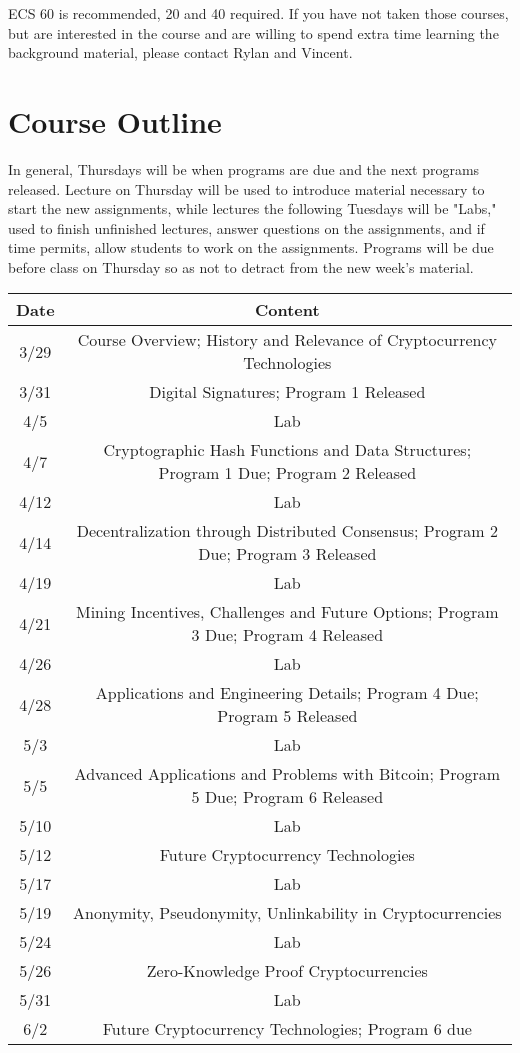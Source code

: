\documentclass{article}
\begin{document}
ECS 60 is recommended, 20 and 40 required. If you have not taken those courses, but are interested in the course and are willing to spend extra time learning the background material, please contact Rylan and Vincent.

\pagebreak

\section*{Course Outline}

In general, Thursdays will be when programs are due and the next programs released. Lecture on Thursday will be used to introduce material necessary to start the new assignments, while lectures the following Tuesdays will be "Labs," used to finish unfinished lectures, answer questions on the assignments, and if time permits, allow students to work on the assignments. Programs will be due before class on Thursday so as not to detract from the new week's material.\newline

\begin{tabularx}{\textwidth}{c|c}
\hline
Date & Content\\
\hline
3/29 & Course Overview; History and Relevance of Cryptocurrency Technologies\\
3/31 & Digital Signatures; Program 1 Released\\
4/5 & Lab\\
4/7 & Cryptographic Hash Functions and Data Structures; Program 1 Due; Program 2 Released\\
4/12 & Lab\\
4/14 & Decentralization through Distributed Consensus; Program 2 Due; Program 3 Released\\
4/19 & Lab\\
4/21 & Mining Incentives, Challenges and Future Options; Program 3 Due; Program 4 Released\\
4/26 & Lab\\
4/28 & Applications and Engineering Details; Program 4 Due; Program 5 Released\\
5/3 & Lab\\
5/5 & Advanced Applications and Problems with Bitcoin; Program 5 Due; Program 6 Released\\
5/10 & Lab\\
5/12 & Future Cryptocurrency Technologies\\
5/17 & Lab\\
5/19 & Anonymity, Pseudonymity, Unlinkability in Cryptocurrencies\\
5/24 & Lab\\
5/26 & Zero-Knowledge Proof Cryptocurrencies\\
5/31 & Lab\\
6/2 & Future Cryptocurrency Technologies; Program 6 due\\

\end{tabularx}
\end{document}
